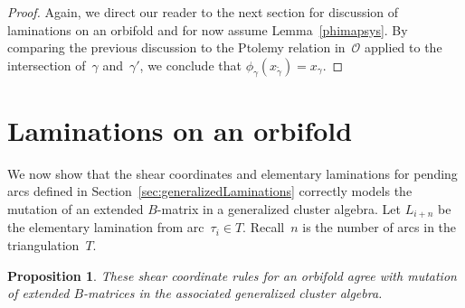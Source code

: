 \documentclass[11pt]{article}
\numberwithin{equation}{section}
\newtheorem{Proposition}[Theorem]{Proposition}
\begin{document}
\begin{proof}
Again, we direct our reader to the next section for discussion of laminations on an orbifold and for now assume Lemma~\ref{phimapsys}. By comparing the previous discussion to the Ptolemy relation in~$\mathcal{O}$ applied to the intersection of~$\gamma$ and~$\gamma'$, we conclude that $\phi_\gamma(x_{\widetilde{\gamma}}) = x_\gamma$.
\end{proof}

\section{Laminations on an orbifold}\label{sec:orbifoldLaminations}

We now show that the shear coordinates and elementary laminations for pending arcs defined in Section~\ref{sec:generalizedLaminations} correctly models the mutation of an extended $B$-matrix in a generalized cluster algebra.
Let $L_{i+n}$ be the elementary lamination from arc~$\tau_i \in T$. Recall~$n$ is the number of arcs in the triangulation~$T$.

\begin{Proposition}\label{prop:ShearCoordMutation}
These shear coordinate rules for an orbifold agree with mutation of extended $B$-matrices in the associated generalized cluster algebra.
\end{Proposition}
\end{document}
